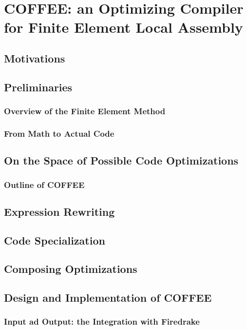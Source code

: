 \chapter{COFFEE: an Optimizing Compiler for Finite Element Local Assembly}
\section{Motivations}

\section{Preliminaries}
\subsection{Overview of the Finite Element Method}
\subsection{From Math to Actual Code}

\section{On the Space of Possible Code Optimizations}
\subsection{Outline of COFFEE}

\section{Expression Rewriting}

\section{Code Specialization}

\section{Composing Optimizations}

\section{Design and Implementation of COFFEE}
\subsection{Input ad Output: the Integration with Firedrake}
